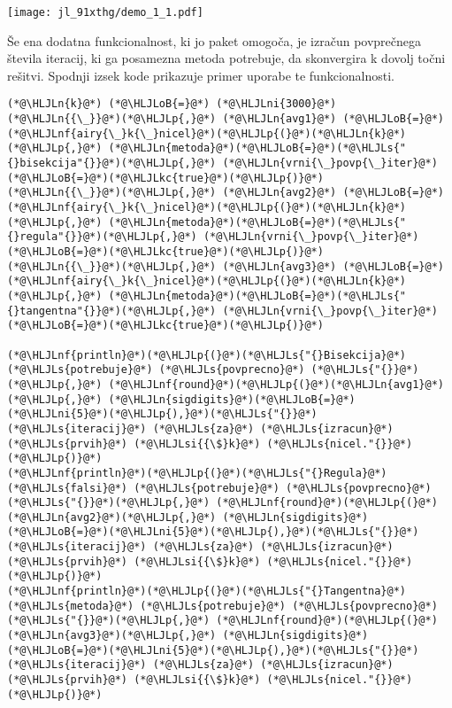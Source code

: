 \documentclass[12pt,a4paper]{article}
\newcommand{\HLJLkc}[1]{\textcolor[RGB]{59,151,46}{\textit{#1}}}
\newcommand{\HLJLn}[1]{#1}
\newcommand{\HLJLnf}[1]{\textcolor[RGB]{66,102,213}{#1}}
\newcommand{\HLJLs}[1]{\textcolor[RGB]{201,61,57}{#1}}
\newcommand{\HLJLsi}[1]{#1}
\newcommand{\HLJLni}[1]{\textcolor[RGB]{59,151,46}{#1}}
\newcommand{\HLJLoB}[1]{\textcolor[RGB]{102,102,102}{\textbf{#1}}}
\newcommand{\HLJLp}[1]{#1}
\begin{document}
\texttt{[image: jl\_91xthg/demo\_1\_1.pdf]}

Še ena dodatna funkcionalnost, ki jo paket omogoča, je izračun povprečnega števila iteracij, ki ga posamezna metoda potrebuje, da skonvergira k dovolj točni rešitvi. Spodnji izsek kode prikazuje primer uporabe te funkcionalnosti.


\begin{lstlisting}
(*@\HLJLn{k}@*) (*@\HLJLoB{=}@*) (*@\HLJLni{3000}@*)
(*@\HLJLn{{\_}}@*)(*@\HLJLp{,}@*) (*@\HLJLn{avg1}@*) (*@\HLJLoB{=}@*) (*@\HLJLnf{airy{\_}k{\_}nicel}@*)(*@\HLJLp{(}@*)(*@\HLJLn{k}@*)(*@\HLJLp{,}@*) (*@\HLJLn{metoda}@*)(*@\HLJLoB{=}@*)(*@\HLJLs{"{}bisekcija"{}}@*)(*@\HLJLp{,}@*) (*@\HLJLn{vrni{\_}povp{\_}iter}@*)(*@\HLJLoB{=}@*)(*@\HLJLkc{true}@*)(*@\HLJLp{)}@*)
(*@\HLJLn{{\_}}@*)(*@\HLJLp{,}@*) (*@\HLJLn{avg2}@*) (*@\HLJLoB{=}@*) (*@\HLJLnf{airy{\_}k{\_}nicel}@*)(*@\HLJLp{(}@*)(*@\HLJLn{k}@*)(*@\HLJLp{,}@*) (*@\HLJLn{metoda}@*)(*@\HLJLoB{=}@*)(*@\HLJLs{"{}regula"{}}@*)(*@\HLJLp{,}@*) (*@\HLJLn{vrni{\_}povp{\_}iter}@*)(*@\HLJLoB{=}@*)(*@\HLJLkc{true}@*)(*@\HLJLp{)}@*)
(*@\HLJLn{{\_}}@*)(*@\HLJLp{,}@*) (*@\HLJLn{avg3}@*) (*@\HLJLoB{=}@*) (*@\HLJLnf{airy{\_}k{\_}nicel}@*)(*@\HLJLp{(}@*)(*@\HLJLn{k}@*)(*@\HLJLp{,}@*) (*@\HLJLn{metoda}@*)(*@\HLJLoB{=}@*)(*@\HLJLs{"{}tangentna"{}}@*)(*@\HLJLp{,}@*) (*@\HLJLn{vrni{\_}povp{\_}iter}@*)(*@\HLJLoB{=}@*)(*@\HLJLkc{true}@*)(*@\HLJLp{)}@*)

(*@\HLJLnf{println}@*)(*@\HLJLp{(}@*)(*@\HLJLs{"{}Bisekcija}@*) (*@\HLJLs{potrebuje}@*) (*@\HLJLs{povprecno}@*) (*@\HLJLs{"{}}@*)(*@\HLJLp{,}@*) (*@\HLJLnf{round}@*)(*@\HLJLp{(}@*)(*@\HLJLn{avg1}@*)(*@\HLJLp{,}@*) (*@\HLJLn{sigdigits}@*)(*@\HLJLoB{=}@*)(*@\HLJLni{5}@*)(*@\HLJLp{),}@*)(*@\HLJLs{"{}}@*) (*@\HLJLs{iteracij}@*) (*@\HLJLs{za}@*) (*@\HLJLs{izracun}@*) (*@\HLJLs{prvih}@*) (*@\HLJLsi{{\$}k}@*) (*@\HLJLs{nicel."{}}@*)(*@\HLJLp{)}@*)
(*@\HLJLnf{println}@*)(*@\HLJLp{(}@*)(*@\HLJLs{"{}Regula}@*) (*@\HLJLs{falsi}@*) (*@\HLJLs{potrebuje}@*) (*@\HLJLs{povprecno}@*) (*@\HLJLs{"{}}@*)(*@\HLJLp{,}@*) (*@\HLJLnf{round}@*)(*@\HLJLp{(}@*)(*@\HLJLn{avg2}@*)(*@\HLJLp{,}@*) (*@\HLJLn{sigdigits}@*)(*@\HLJLoB{=}@*)(*@\HLJLni{5}@*)(*@\HLJLp{),}@*)(*@\HLJLs{"{}}@*) (*@\HLJLs{iteracij}@*) (*@\HLJLs{za}@*) (*@\HLJLs{izracun}@*) (*@\HLJLs{prvih}@*) (*@\HLJLsi{{\$}k}@*) (*@\HLJLs{nicel."{}}@*)(*@\HLJLp{)}@*)
(*@\HLJLnf{println}@*)(*@\HLJLp{(}@*)(*@\HLJLs{"{}Tangentna}@*) (*@\HLJLs{metoda}@*) (*@\HLJLs{potrebuje}@*) (*@\HLJLs{povprecno}@*) (*@\HLJLs{"{}}@*)(*@\HLJLp{,}@*) (*@\HLJLnf{round}@*)(*@\HLJLp{(}@*)(*@\HLJLn{avg3}@*)(*@\HLJLp{,}@*) (*@\HLJLn{sigdigits}@*)(*@\HLJLoB{=}@*)(*@\HLJLni{5}@*)(*@\HLJLp{),}@*)(*@\HLJLs{"{}}@*) (*@\HLJLs{iteracij}@*) (*@\HLJLs{za}@*) (*@\HLJLs{izracun}@*) (*@\HLJLs{prvih}@*) (*@\HLJLsi{{\$}k}@*) (*@\HLJLs{nicel."{}}@*)(*@\HLJLp{)}@*)
\end{lstlisting}
\end{document}

